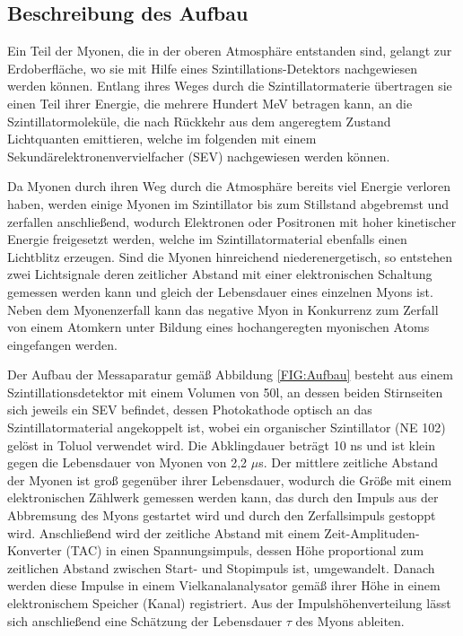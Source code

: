\subsection{Beschreibung des Aufbau}
Ein Teil der Myonen, die in der oberen Atmosphäre entstanden sind, gelangt zur Erdoberfläche, wo sie  mit Hilfe eines Szintillations-Detektors nachgewiesen werden können. Entlang ihres Weges durch die Szintillatormaterie übertragen sie einen Teil ihrer Energie, die mehrere Hundert MeV betragen kann, an die Szintillatormoleküle, die nach Rückkehr aus dem angeregtem Zustand Lichtquanten emittieren, welche im folgenden mit einem Sekundärelektronenvervielfacher (SEV) nachgewiesen werden können.

Da Myonen durch ihren Weg durch die Atmosphäre bereits viel Energie verloren haben, werden einige Myonen im Szintillator bis zum Stillstand abgebremst und zerfallen anschließend, wodurch Elektronen oder Positronen mit hoher kinetischer Energie freigesetzt werden, welche im Szintillatormaterial ebenfalls einen Lichtblitz erzeugen. Sind die Myonen hinreichend niederenergetisch, so entstehen zwei Lichtsignale deren zeitlicher Abstand mit einer elektronischen Schaltung gemessen werden kann und gleich der Lebensdauer eines einzelnen Myons ist. Neben dem Myonenzerfall kann das negative Myon in Konkurrenz zum Zerfall von einem Atomkern unter Bildung eines hochangeregten myonischen Atoms eingefangen werden.

Der Aufbau der Messaparatur gemäß Abbildung \ref{FIG:Aufbau} besteht aus einem Szintillationsdetektor mit einem Volumen von 50l, an dessen beiden Stirnseiten sich jeweils ein SEV befindet, dessen Photokathode optisch an das Szintillatormaterial angekoppelt ist, wobei ein organischer Szintillator (NE  102) gelöst in Toluol verwendet wird. Die Abklingdauer beträgt 10 ns und ist klein gegen die Lebensdauer von Myonen von 2,2 $\mu$s\cite{PDG}. Der mittlere zeitliche Abstand der Myonen ist groß gegenüber ihrer Lebensdauer, wodurch die Größe mit einem elektronischen Zählwerk gemessen werden kann, das durch den Impuls aus der Abbremsung des Myons gestartet wird und durch den Zerfallsimpuls gestoppt wird. Anschließend wird der zeitliche Abstand mit einem Zeit-Amplituden-Konverter (TAC) in einen Spannungsimpuls, dessen Höhe proportional zum zeitlichen Abstand zwischen Start- und Stopimpuls ist, umgewandelt. Danach werden diese Impulse in einem Vielkanalanalysator gemäß ihrer Höhe in einem elektronischem Speicher (Kanal) registriert. Aus der Impulshöhenverteilung lässt sich anschließend  eine Schätzung der Lebensdauer $\tau$ des Myons ableiten.

